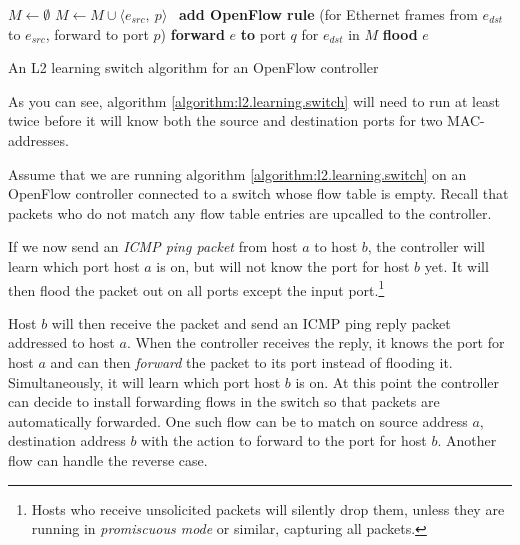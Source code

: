 \begin{algorithm}
  \begin{algorithmic}
    \State $M \gets \emptyset$
    \State
      \State $M \gets M \cup \langle e_{src},\ p \rangle$ 
      \State
      \State \textbf{add OpenFlow rule }(for Ethernet frames from $e_{dst}$ to
        $e_{src}$, forward to port $p$)
      \State
        \State \textbf{forward} $e$ \textbf{to} port $q$ for $e_{dst}$ in $M$
      \Else
        \State \textbf{flood} $e$ 
      \EndIf
    \EndOn
  \end{algorithmic}
  \caption{An L2 learning switch algorithm for an OpenFlow controller}
  \label{algorithm:l2.learning.switch}
\end{algorithm}

As you can see, algorithm \ref{algorithm:l2.learning.switch} will need to
run at least twice before it will know both the source and destination ports
for two MAC-addresses.

Assume that we are running algorithm \ref{algorithm:l2.learning.switch} on
an OpenFlow controller connected to a switch whose flow table is empty.
%
Recall that packets who do not match any flow table entries are upcalled to
the controller.

If we now send an \textit{\acs{ICMP} ping packet} from host $a$ to
host $b$, the controller will learn which port host $a$ is on, but will not know
the port for host $b$ yet.
%
It will then flood the packet out on all ports except the input port.\footnote{
Hosts who receive unsolicited packets will silently drop them,
unless they are running in \textit{promiscuous mode} or similar, capturing
all packets.}

Host $b$ will then receive the packet and send an \acs{ICMP} ping reply packet
addressed to host $a$.
%
When the controller receives the reply, it knows the port for host $a$ and
can then \textit{forward} the packet to its port instead of flooding it.
%
Simultaneously, it will learn which port host $b$ is on.
%
At this point the controller can decide to install forwarding flows in the
switch so that packets are automatically forwarded.
%
One such flow can be to match on source address $a$, destination address
$b$ with the action to forward to the port for host $b$.
%
Another flow can handle the reverse case.

